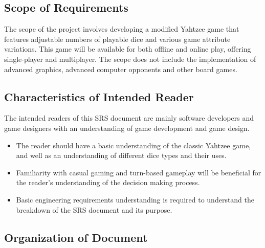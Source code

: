 \subsection{Scope of Requirements} 

The scope of the project involves developing a modified Yahtzee game that features adjustable numbers of playable dice and various game attribute variations. This game will be available for both offline and online play, offering single-player and multiplayer. The scope does not include the implementation of advanced graphics, advanced computer opponents and other board games.

\subsection{Characteristics of Intended Reader} \label{sec_IntendedReader}

The intended readers of this SRS document are mainly software developers and game designers with an understanding of game development and game design.

\begin{itemize}
    \item The reader should have a basic understanding of the classic Yahtzee game, and well as an understanding of different dice types and their uses.
    \item Familiarity with casual gaming and turn-based gameplay will be beneficial for the reader's understanding of the decision making process.
    \item Basic engineering requirements understanding is required to understand the breakdown of the SRS document and its purpose.
\end{itemize}


\subsection{Organization of Document}


